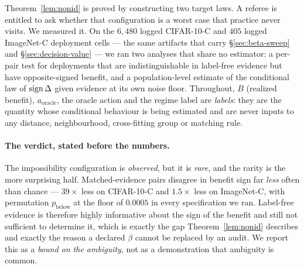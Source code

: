 %
%
%

Theorem~\ref{lem:nonid} is proved by constructing two target laws. A referee is entitled to ask
whether that configuration is a worst case that practice never visits. We measured it. On the
$6{,}480$ logged CIFAR-10-C and $405$ logged ImageNet-C deployment cells --- the same artifacts that
carry \S\ref{sec:beta-sweep} and \S\ref{sec:decision-value} --- we ran two analyses that share no
estimator: a per-pair test for deployments that are indistinguishable in label-free evidence but
have opposite-signed benefit, and a population-level estimate of the conditional law of
$\operatorname{sign}\Delta$ given evidence at its own noise floor. Throughout, $B$ (realized benefit),
$a_{\mathrm{oracle}}$, the oracle action and the regime label are \emph{labels}: they are the
quantity whose conditional behaviour is being estimated and are never inputs to any distance,
neighbourhood, cross-fitting group or matching rule.

\paragraph{The verdict, stated before the numbers.} The impossibility configuration is
\emph{observed}, but it is \emph{rare}, and the rarity is the more surprising half. Matched-evidence
pairs disagree in benefit sign far \emph{less} often than chance --- $39\times$ less on CIFAR-10-C
and $1.5\times$ less on ImageNet-C, with permutation $p_{\text{below}}$ at the floor of $0.0005$ in
every specification we ran. Label-free evidence is therefore highly informative about the sign of
the benefit and still not sufficient to determine it, which is exactly the gap
Theorem~\ref{lem:nonid} describes and exactly the reason a declared $\beta$ cannot be replaced by an
audit. We report this as a \emph{bound on the ambiguity}, not as a demonstration that ambiguity is
common.

